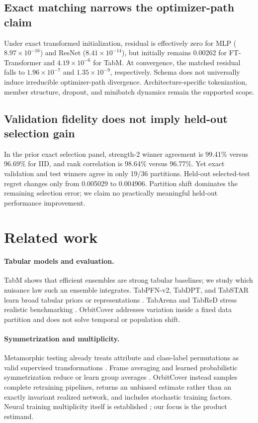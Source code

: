 \documentclass{article}
\begin{document}
\subsection{Exact matching narrows the optimizer-path claim}

Under exact transformed initialization, residual is effectively zero for MLP
($8.97\times10^{-16}$) and ResNet ($8.41\times10^{-14}$), but initially
remains 0.00262 for FT-Transformer and $4.19\times10^{-6}$ for TabM. At
convergence, the matched residual falls to $1.96\times10^{-7}$ and
$1.35\times10^{-9}$, respectively. Schema does not universally induce
irreducible optimizer-path divergence. Architecture-specific tokenization,
member structure, dropout, and minibatch dynamics remain the supported scope.

\subsection{Validation fidelity does not imply held-out selection gain}

In the prior exact selection panel, strength-2 winner agreement is 99.41\%
versus 96.69\% for IID, and rank correlation is 98.64\% versus 96.77\%.
Yet exact validation and test winners agree in only 19/36 partitions.
Held-out selected-test regret changes only from 0.005029 to 0.004906.
Partition shift dominates the remaining selection error; we claim no
practically meaningful held-out performance improvement.

\section{Related work}

\paragraph{Tabular models and evaluation.}
TabM \citep{gorishniy2025tabm} shows that efficient ensembles are strong
tabular baselines; we study which nuisance law such an ensemble integrates.
TabPFN-v2, TabDPT, and TabSTAR learn broad tabular priors or representations
\citep{hollmann2025tabpfn,ma2025tabdpt,arazi2025tabstar}. TabArena and TabReD
stress realistic benchmarking \citep{erickson2025tabarena,rubachev2025tabred}.
OrbitCover addresses variation inside a fixed data partition and does not
solve temporal or population shift.

\paragraph{Symmetrization and multiplicity.}
Metamorphic testing already treats attribute and class-label permutations as
valid supervised transformations \citep{xie2011metamorphic}. Frame averaging
and learned probabilistic symmetrization reduce or learn group averages
\citep{puny2022frame,kim2023probabilistic}. OrbitCover instead samples
complete retraining pipelines, returns an unbiased estimate rather than an
exactly invariant realized network, and includes stochastic training factors.
Neural training multiplicity itself is established
\citep{summers2021nondeterminism}; our focus is the product estimand.
\end{document}
